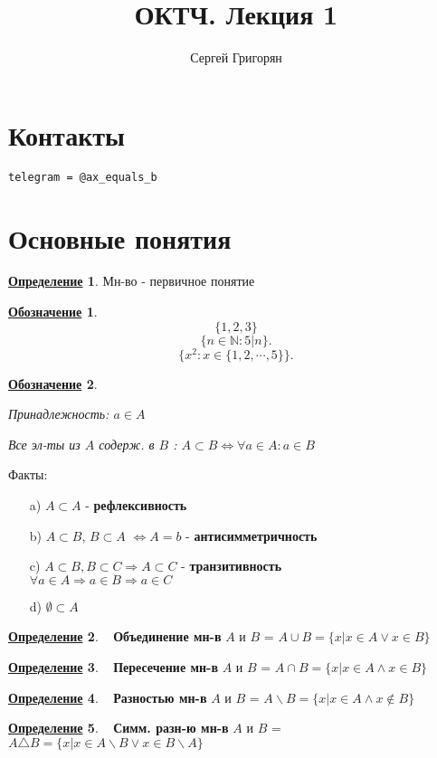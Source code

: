 \documentclass[a4, 12pt]{article}
\title{ОКТЧ. Лекция 1}
\author{Сергей Григорян}
\newcommand{\N}{\mathbb{N}}
\newtheorem*{symb}{\underline{Обозначение}}
\theoremstyle{definition}
\newtheorem{definition}{\underline{Определение}}[section]
\begin{document}
\maketitle
\newpage
\section{Контакты}
\begin{verbatim}
telegram = @ax_equals_b
\end{verbatim}

\section{Основные понятия}
\begin{definition}
Мн-во - первичное понятие
\end{definition}

\begin{symb}
    \[
        \{1, 2, 3\}
    \]
    \[
    \{n \in \N \colon 5 | n\}
    .\] 
    \[
    \{x^2 \colon x \in \{1, 2, \cdots, 5\}\}
    .\] 
\end{symb}

\begin{symb}
~\newline

Принадлежность: $a \in A$ 

Все эл-ты из $A$ содерж. в $B$ : $A \subset B \iff \forall a \in A \colon a \in B$

\end{symb}

Факты:
\begin{itemize}
    \item[a) ] $A \subset A$ - \textbf{рефлексивность} 
    \item[b) ] $A \subset B$, $B \subset A$ $\iff A = b$ - \textbf{антисимметричность}
    \item[c) ] $A \subset B, B \subset C \Rightarrow A \subset C$ - \textbf{транзитивность}\\
        $\forall a \in A \Rightarrow a \in B \Rightarrow a \in C$
    \item[d) ] $\emptyset \subset A$ 
\end{itemize}

\begin{definition}
~\newline
\textbf{Объединение мн-в}  $A$ и $B$ = $A \cup B = \{x | x \in A \lor  x \in B\}$
\end{definition}
\begin{definition}
~\newline
\textbf{Пересечение мн-в} $A$ и $B$ = $A \cap B = \{x | x \in A \land x \in B\}$
\end{definition}
\begin{definition}
~\newline
\textbf{Разностью мн-в} $A$ и $B$ = $A \backslash B =  \{x | x \in A \land x \not\in B\}$
\end{definition}
\begin{definition}
~\newline
\textbf{Симм. разн-ю мн-в} $A$ и $B$ = $A \triangle B = \{x | x \in A \backslash B \lor x \in B \backslash A\}$
\end{definition}
\end{document}
